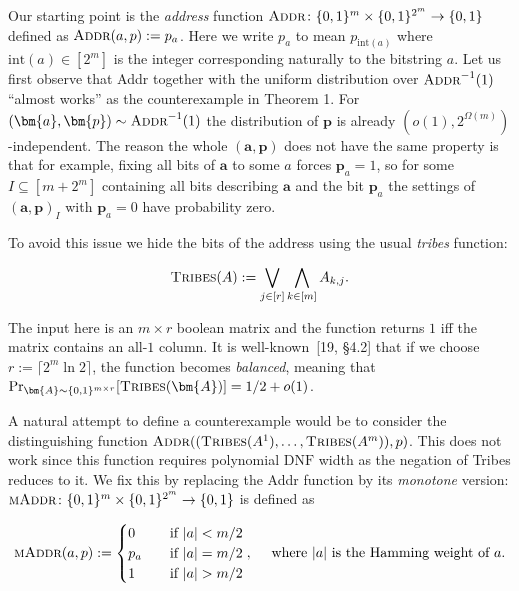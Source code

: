 \documentclass[10pt,a4paper]{article}
\begin{document}
Our starting point is the \emph{address} function $\textsc{Addr}\colon\{0,1\}^{m}\times\{0,1\}^{2^{m}}\to\{0,1\}$ defined as $\textsc{Addr}(a,p):=p_{a}$. Here we write $p_{a}$ to mean $p_{\text{int}(a)}$ where $\text{int}(a)\in[2^{m}]$ is the integer corresponding naturally to the bitstring $a$. Let us first observe that Addr together with the uniform distribution over $\textsc{Addr}^{-1}(1)$ “almost works” as the counterexample in Theorem 1. For $(\bm{a},\bm{p})\sim\textsc{Addr}^{-1}(1)$ the distribution of $\bm{p}$ is already $(o(1),2^{\Omega(m)})$-independent. The reason the whole $(\bm{a},\bm{p})$ does not have the same property is that for example, fixing all bits of $\bm{a}$ to some $a$ forces $\bm{p}_{a}=1$, so for some $I\subseteq[m+2^{m}]$ containing all bits describing $\bm{a}$ and the bit $\bm{p}_{a}$ the settings of $(\bm{a},\bm{p})_{I}$ with $\bm{p}_{a}=0$ have probability zero.\par




To avoid this issue we hide the bits of the address using the usual \emph{tribes} function:\par


\[\begin{gathered}
\textsc{Tribes}(A):=\bigvee_{j\in[r]}\bigwedge_{k\in[m]}A_{k,j}.
\end{gathered}\]


The input here is an $m\times r$ boolean matrix and the function returns $1$ iff the matrix contains an all-$1$ column. It is well-known [19, §4.2] that if we choose $r:=\lceil 2^{m}\ln 2\rceil$, the function becomes \emph{balanced}, meaning that $\Pr_{\bm{A}\sim\{0,1\}^{m\times r}}[\textsc{Tribes}(\bm{A})]=1/2+o(1)$.\par




A natural attempt to define a counterexample would be to consider the distinguishing function $\textsc{Addr}((\textsc{Tribes}(A^{1}),\dots,\textsc{Tribes}(A^{m})),p)$. This does not work since this function requires polynomial $\mathrm{DNF}$ width as the negation of Tribes reduces to it. We fix this by replacing the Addr function by its \emph{monotone} version: $\textsc{mAddr}\colon\{0,1\}^{m}\times\{0,1\}^{2^{m}}\to\{0,1\}$ is defined as\par


\[\begin{gathered}
\textsc{mAddr}(a,p):=\begin{cases}0&\quad\text{if $|a|<m/2$}\\
p_{a}&\quad\text{if $|a|=m/2$}\\
1&\quad\text{if $|a|>m/2$}\end{cases},\quad\text{ where $|a|$ is the Hamming weight of $a$.}
\end{gathered}\]
\end{document}
